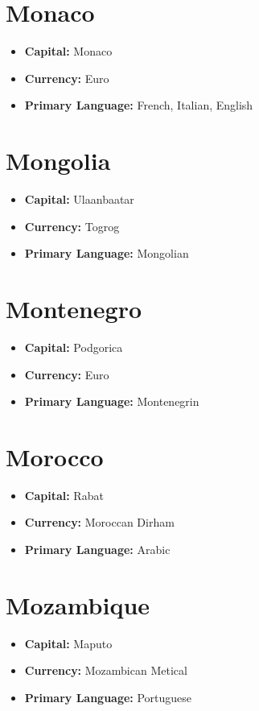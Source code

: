 \documentclass[a4paper,100pt,twoside]{book}
\begin{document}
\section*{\Huge Monaco}
\vspace{5mm} %
\begin{itemize}
	\item \textbf{Capital:} Monaco
	\item \textbf{Currency:} Euro
	\item \textbf{Primary Language:} French, Italian, English
\end{itemize}

\section*{\Huge Mongolia}
\vspace{5mm} %
\begin{itemize}
	\item \textbf{Capital:} Ulaanbaatar
	\item \textbf{Currency:} Togrog
	\item \textbf{Primary Language:} Mongolian
\end{itemize}

\section*{\Huge Montenegro}
\vspace{5mm} %
\begin{itemize}
	\item \textbf{Capital:} Podgorica
	\item \textbf{Currency:} Euro
	\item \textbf{Primary Language:} Montenegrin
\end{itemize}

\section*{\Huge Morocco}
\vspace{5mm} %
\begin{itemize}
	\item \textbf{Capital:} Rabat
	\item \textbf{Currency:} Moroccan Dirham
	\item \textbf{Primary Language:} Arabic
\end{itemize}

\section*{\Huge Mozambique}
\vspace{5mm} %
\begin{itemize}
	\item \textbf{Capital:} Maputo
	\item \textbf{Currency:} Mozambican Metical
	\item \textbf{Primary Language:} Portuguese
\end{itemize}
\end{document}
